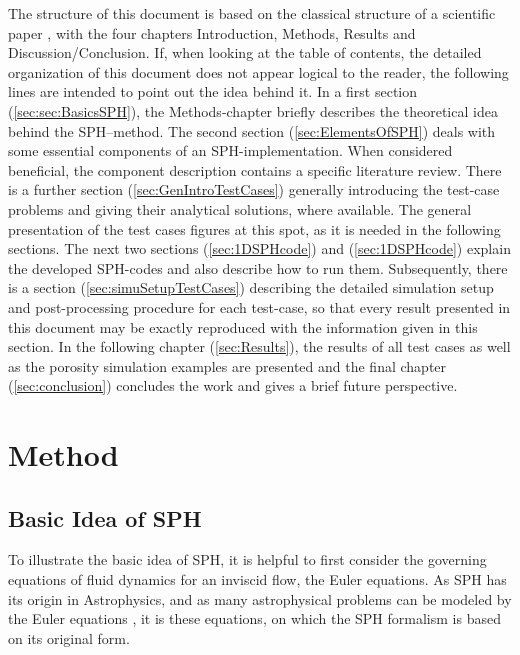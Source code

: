 \documentclass[11pt,a4paper,twoside]{report}
\begin{document}
The structure of this document is based on the classical structure of a scientific paper \cite{Day2006}, with the four chapters Introduction, Methods, Results and Discussion/Conclusion. If, when looking at the table of contents, the detailed organization of this document does not appear logical to the reader, the following lines are intended to point out the idea behind it.
In a first section (\ref{sec:sec:BasicsSPH}), the Methods-chapter briefly describes the theoretical idea behind the SPH--method. The second section (\ref{sec:ElementsOfSPH}) deals with some essential components of an SPH-implementation. When considered beneficial, the component description contains a specific literature review. There is a further section (\ref{sec:GenIntroTestCases}) generally introducing the test-case problems and giving their analytical solutions, where available. The general presentation of the test cases figures at this spot, as it is needed in the following sections. The next two sections (\ref{sec:1DSPHcode}) and (\ref{sec:1DSPHcode}) explain the developed SPH-codes and also describe how to run them. Subsequently, there is a section (\ref{sec:simuSetupTestCases}) describing the detailed simulation setup and post-processing procedure for each test-case, so that every result presented in this document may be exactly reproduced with the information given in this section.
In the following chapter (\ref{sec:Results}), the results of all test cases as well as the porosity simulation examples are presented and the final chapter (\ref{sec:conclusion}) concludes the work and gives a brief future perspective.


\chapter{Method}
\label{sec:method}
\section{Basic Idea of SPH}
\label{sec:BasicsSPH}

To illustrate the basic idea of SPH, it is helpful to first consider the
governing equations of fluid dynamics for an inviscid flow, the Euler equations.  As SPH has its origin in Astrophysics, and as many astrophysical problems can be modeled by the Euler equations \cite{Liu2003}, it is these equations, on which the SPH formalism is based on its original form. 

\end{document}
